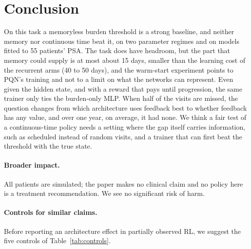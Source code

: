 \documentclass[10pt]{article}
\begin{document}
\section{Conclusion}\label{sec:conclusion}
On this task a memoryless burden threshold is a strong baseline, and neither
memory nor continuous time beat it, on two parameter regimes and on models
fitted to 55 patients' PSA. The task does have headroom, but the part that memory could supply is at most
about 15 days, smaller than the learning cost of the recurrent arms (40 to 50
days), and the warm-start experiment points to PQN's training and not to a limit
on what the networks can represent. Even given the hidden state, and with a
reward that pays until progression, the same trainer only ties the burden-only
MLP. When half of the visits are missed, the question changes from which
architecture uses feedback best to whether feedback has any value, and over one
year, on average, it had none. We think a fair test of a continuous-time policy needs a
setting where the gap itself carries information, such as scheduled instead of
random visits, and a trainer that can first beat the threshold with the true
state.

\paragraph{Broader impact.} All patients are simulated; the paper makes no clinical claim and no policy here is a treatment recommendation. We see no significant risk of harm.

\paragraph{Controls for similar claims.} Before reporting an architecture
effect in partially observed RL, we suggest the five controls of
Table~\ref{tab:controls}.
\end{document}
